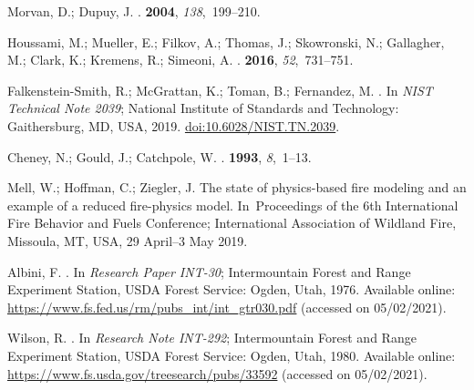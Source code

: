 \documentclass[atmosphere,article,accept,moreauthors,pdftex]{Definitions/mdpi}
\begin{document}
\begin{thebibliography}{999}
Morvan, D.; Dupuy, J.
.
 {\bf 2004}, {\em 138},~199--210.

Houssami, M.; Mueller, E.; Filkov, A.; Thomas, J.; Skowronski, N.; Gallagher,
  M.; Clark, K.; Kremens, R.; Simeoni, A.
.
 {\bf 2016}, {\em 52},~731--751.

Falkenstein-Smith, R.; McGrattan, K.; Toman, B.; Fernandez, M.
.
\newblock In {\em NIST Technical Note 2039}; National Institute of Standards and
  Technology: Gaithersburg, MD, USA,  2019.
\newblock
  \href{doi:10.6028/NIST.TN.2039}{doi:10.6028/NIST.TN.2039}.

Cheney, N.; Gould, J.; Catchpole, W.
.
 {\bf 1993}, {\em
  8},~1--13.

Mell, W.; Hoffman, C.; Ziegler, J.
\newblock The state of physics-based fire modeling and an example of a reduced
  fire-physics model.
\newblock   In~Proceedings of the 6th International Fire Behavior and Fuels Conference; International
  Association of Wildland Fire, Missoula, MT, USA, 29 April--3 May  2019.

Albini, F.
.
\newblock In \emph{Research Paper INT-30};  Intermountain Forest and Range Experiment
  Station, USDA Forest Service: Ogden, Utah,  1976.
\newblock
   {Available online: \url{https://www.fs.fed.us/rm/pubs_int/int_gtr030.pdf} (accessed on 05/02/2021).} 

Wilson, R.
.
\newblock In \emph{Research Note INT-292}; Intermountain Forest and Range Experiment
  Station, USDA Forest Service: Ogden, Utah,  1980.
\newblock
   {Available online: \url{https://www.fs.usda.gov/treesearch/pubs/33592} (accessed on 05/02/2021).} 


\end{thebibliography}
\end{document}
